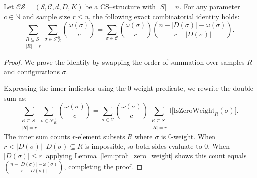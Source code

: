 \begin{lemma}
\label{lem:clarkson_shor_main_lemma}
Let $\mathcal{CS} = (S, \mathcal{C}, d, D, K)$ be a CS--structure with $|S| = n$. For any parameter $c \in \mathbb{N}$ and sample size $r \le n$, the following exact combinatorial identity holds:
\[
\sum_{\substack{R \subseteq S \\ |R| = r}} \sum_{\sigma \in \mathcal{F}_R^0} \binom{\omega(\sigma)}{c} = \sum_{\sigma \in \mathcal{C}} \binom{\omega(\sigma)}{c} \binom{n - |D(\sigma)| - \omega(\sigma)}{r - |D(\sigma)|}.
\]
\end{lemma}
\begin{proof}
\leanok
We prove the identity by swapping the order of summation over samples $R$ and configurations $\sigma$.

Expressing the inner indicator using the $0$-weight predicate, we rewrite the double sum as:
\[
\sum_{\substack{R \subseteq S \\ |R| = r}} \sum_{\sigma \in \mathcal{F}_R^0} \binom{\omega(\sigma)}{c} = \sum_{\sigma \in \mathcal{C}} \binom{\omega(\sigma)}{c} \sum_{\substack{R \subseteq S \\ |R| = r}} \mathbb{I}\big[\mathrm{IsZeroWeight}_R(\sigma)\big].
\]
The inner sum counts $r$-element subsets $R$ where $\sigma$ is $0$-weight. When $r < |D(\sigma)|$, $D(\sigma) \subseteq R$ is impossible, so both sides evaluate to $0$. When $|D(\sigma)| \le r$, applying Lemma~\ref{lem:prob_zero_weight} shows this count equals $\binom{n - |D(\sigma)| - \omega(\sigma)}{r - |D(\sigma)|}$, completing the proof.
\end{proof}


